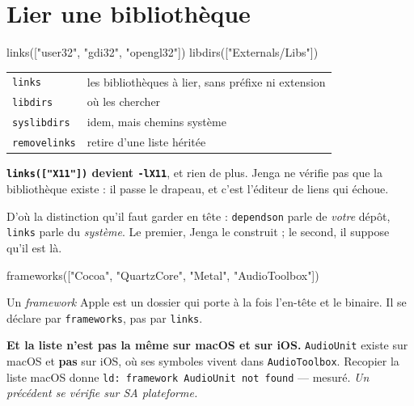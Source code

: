 \section{Lier une bibliothèque}

\begin{nkcode}{}
links(["user32", "gdi32", "opengl32"])
libdirs(["Externals/Libs"])
\end{nkcode}

\begin{center}
\begin{tabular}{@{}ll@{}}
\toprule
\texttt{links} & les bibliothèques à lier, sans préfixe ni extension \\
\texttt{libdirs} & où les chercher \\
\texttt{syslibdirs} & idem, mais chemins système \\
\texttt{removelinks} & retire d'une liste héritée \\
\bottomrule
\end{tabular}
\end{center}

\begin{nkretenir}
\textbf{\texttt{links(["X11"])} devient \texttt{-lX11}}, et rien de plus. Jenga ne
vérifie pas que la bibliothèque existe : il passe le drapeau, et c'est l'éditeur
de liens qui échoue.

D'où la distinction qu'il faut garder en tête : \texttt{dependson} parle de
\emph{votre} dépôt, \texttt{links} parle du \emph{système}. Le premier, Jenga le
construit ; le second, il suppose qu'il est là.
\end{nkretenir}

\begin{nkretenir}
\begin{nkcode}{}
frameworks(["Cocoa", "QuartzCore", "Metal", "AudioToolbox"])
\end{nkcode}

Un \emph{framework} Apple est un dossier qui porte à la fois l'en-tête et le
binaire. Il se déclare par \texttt{frameworks}, pas par \texttt{links}.

\alerte{} \textbf{Et la liste n'est pas la même sur macOS et sur iOS.}
\texttt{AudioUnit} existe sur macOS et \textbf{pas} sur iOS, où ses symboles
vivent dans \texttt{AudioToolbox}. Recopier la liste macOS donne
\texttt{ld: framework AudioUnit not found} --- mesuré. \emph{Un précédent se
vérifie sur SA plateforme.}
\end{nkretenir}

